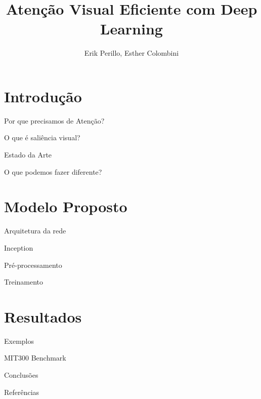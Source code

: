\documentclass[10pt]{beamer}
\title{Atenção Visual Eficiente com Deep Learning}
\subtitle{}
\author{Erik Perillo, Esther Colombini}
\date{}
\institute{Universidade Estadual de Campinas}
\begin{document}
\maketitle

\section{Introdução}

\begin{frame}{Por que precisamos de Atenção?}
\end{frame}

\begin{frame}{O que é saliência visual?}
\end{frame}

\begin{frame}{Estado da Arte}
\end{frame}

\begin{frame}{O que podemos fazer diferente?}
\end{frame}

\section{Modelo Proposto}

\begin{frame}{Arquitetura da rede}
\end{frame}

\begin{frame}{Inception}
\end{frame}

\begin{frame}{Pré-processamento}
\end{frame}

\begin{frame}{Treinamento}
\end{frame}

\section{Resultados}

\begin{frame}{Exemplos}
\end{frame}

\begin{frame}{MIT300 Benchmark}
\end{frame}

\begin{frame}{Conclusões}
\end{frame}

\begin{frame}{Referências}
\end{frame}
\end{document}
